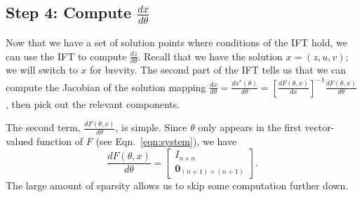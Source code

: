 \documentclass[11pt]{article}
\begin{document}
\subsection*{Step 4: Compute $\frac{dx}{d\theta}$}
Now that we have a set of solution points where conditions of the IFT hold,
we can use the IFT to compute $\frac{dz}{d\theta}$.
Recall that we have the solution $x = (z,u,v)$; we will switch to $x$ for brevity.
The second part of the IFT tells us that we can compute the Jacobian of the
solution mapping $\frac{dx}{d\theta} = \frac{dx^*(\theta)}{d\theta}
= \left[\frac{dF(\theta,x)}{dx}\right]^{-1}\frac{dF(\theta,x)}{d\theta}$,
then pick out the relevant components.

The second term, $\frac{dF(\theta,x)}{d\theta}$, is simple.
Since $\theta$ only appears in the first vector-valued function of $F$
(see Eqn.~\ref{eqn:system}), we have
\begin{equation}
\label{eqn:df-dtheta}
\frac{dF(\theta,x)}{d\theta} = \begin{bmatrix}
    I_{n\times n}\\
    \mathbf{0}_{(n+1)\times (n+1)}
\end{bmatrix}.
\end{equation}
The large amount of sparsity allows us to skip some computation further down.
\end{document}
